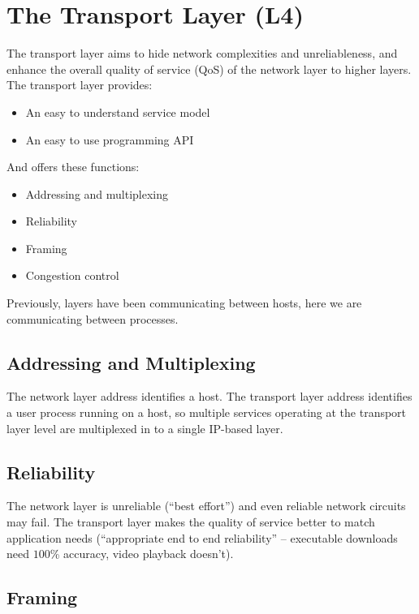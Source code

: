 \section{The Transport Layer (L4)}\label{sec:the_transport_layer_l4_}

The transport layer aims to hide network complexities and unreliableness, and enhance the overall quality of service (QoS) of the network layer to higher layers.
The transport layer provides:
\begin{itemize}
	\item An easy to understand service model
	\item An easy to use programming API
\end{itemize}
And offers these functions:
\begin{itemize}
	\item Addressing and multiplexing
	\item Reliability
	\item Framing
	\item Congestion control
\end{itemize}

\begin{note}
	Previously, layers have been communicating between hosts, here we are communicating between processes.
\end{note}

\subsection{Addressing and Multiplexing}\label{sub:addressing_and_multiplexing}

The network layer address identifies a host.
The transport layer address identifies a user process running on a host, so multiple services operating at the transport layer level are multiplexed in to a single IP-based layer.

\subsection{Reliability}\label{sub:reliability}

The network layer is unreliable (``best effort'') and even reliable network circuits may fail.
The transport layer makes the quality of service better to match application needs (``appropriate end to end reliability'' -- executable downloads need \(100\)\% accuracy, video playback doesn't).

\subsection{Framing}\label{sub:framing}

